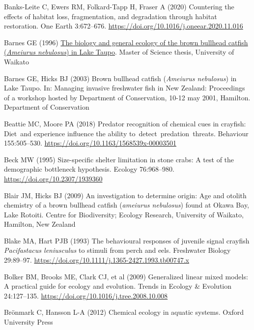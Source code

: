 \documentclass[
  12pt,
  a4paper,
  oneside]{scrbook}
\newlength{\cslhangindent}
\newenvironment{CSLReferences}[2] %
 {\begin{list}{}{%
  \setlength{\itemindent}{0pt}
  \setlength{\leftmargin}{0pt}
  \setlength{\parsep}{0pt}
  \ifodd #1
   \setlength{\leftmargin}{\cslhangindent}
   \setlength{\itemindent}{-1\cslhangindent}
  \fi
  \setlength{\itemsep}{#2\baselineskip}}}
 {\end{list}}
\begin{document}
\begin{CSLReferences}{1}{1}
Banks-Leite C, Ewers RM, Folkard-Tapp H, Fraser A (2020) Countering the
effects of habitat loss, fragmentation, and degradation through habitat
restoration. One Earth 3:672--676.
\url{https://doi.org/10.1016/j.oneear.2020.11.016}

Barnes GE (1996)
\href{https://researchcommons.waikato.ac.nz/items/24cf02c1-8c2f-4b63-ba89-e8a509e9ba05}{The
biology and general ecology of the brown bullhead catfish
({\emph{Ameiurus nebulosus}}) in {Lake Taupo}}. Master of Science
thesis, University of Waikato

Barnes GE, Hicks BJ (2003) Brown bullhead catfish ({\emph{Ameiurus
nebulosus}}) in {Lake Taupo}. In: Managing invasive freshwater fish in
{New Zealand}: Proceedings of a workshop hosted by {Department of
Conservation}, 10-12 may 2001, {Hamilton}. Department of Conservation

Beattie MC, Moore PA (2018) Predator recognition of chemical cues in
crayfish: Diet~and experience influence the ability
to~detect~predation~threats. Behaviour 155:505--530.
\url{https://doi.org/10.1163/1568539x-00003501}

Beck MW (1995) Size-specific shelter limitation in stone crabs: A test
of the demographic bottleneck hypothesis. Ecology 76:968--980.
\url{https://doi.org/10.2307/1939360}

Blair JM, Hicks BJ (2009) An investigation to determine origin: Age and
otolith chemistry of a brown bullhead catfish (\emph{ameiurus
nebulosus}) found at {Okawa Bay, Lake Rotoiti}. Centre for Biodiversity;
Ecology Research, University of Waikato, Hamilton, New Zealand

Blake MA, Hart PJB (1993) The behavioural responses of juvenile signal
crayfish {\emph{Pacifastacus leniusculus}} to stimuli from perch and
eels. Freshwater Biology 29:89--97.
\url{https://doi.org/10.1111/j.1365-2427.1993.tb00747.x}

Bolker BM, Brooks ME, Clark CJ, et al (2009) Generalized linear mixed
models: A practical guide for ecology and evolution. Trends in Ecology
\& Evolution 24:127--135.
\url{https://doi.org/10.1016/j.tree.2008.10.008}

Brönmark C, Hansson L-A (2012) Chemical ecology in aquatic systems.
Oxford University Press


\end{CSLReferences}
\end{document}

